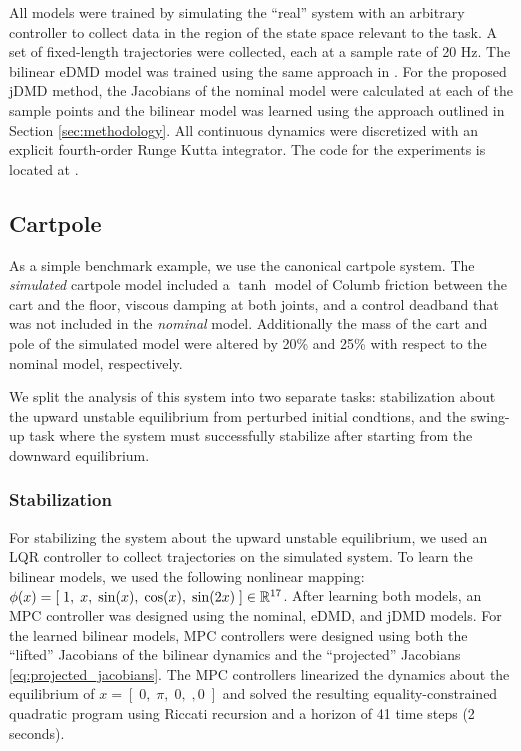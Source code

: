 \documentclass{article}
\begin{document}
All models were trained by simulating the ``real'' system with an arbitrary controller to 
collect data in the region of the state space relevant to the task. A set of fixed-length 
trajectories were collected, each at a sample rate of 20 Hz. The bilinear eDMD model was
trained using the same approach in \cite{Folkestad2021}. For the proposed jDMD method, the
Jacobians of the nominal model were calculated at each of the sample points and the bilinear
model was learned using the approach outlined in Section \ref{sec:methodology}.
All continuous dynamics were discretized with an explicit fourth-order Runge Kutta 
integrator. The code for the experiments is located at 
.


\subsection{Cartpole}
As a simple benchmark example, we use the canonical cartpole system. The \textit{simulated}
cartpole model included a $\tanh$ model of Columb friction between the cart and the 
floor, viscous damping at both joints, and a control deadband that was not included in the 
\textit{nominal} model. Additionally the mass of the cart and pole of the simulated model 
were altered by 20\% and 25\% with respect to the nominal model, respectively. 

We split the analysis of this system into two separate tasks: stabilization about the upward
unstable equilibrium from perturbed initial condtions, and the swing-up task where the 
system must successfully stabilize after starting from the downward equilibrium.

\subsubsection{Stabilization}

For stabilizing the system about the upward unstable equilibrium, we used an LQR controller
to collect trajectories on the simulated system. To learn
the bilinear models, we used the following nonlinear mapping: $\phi(x) = [\; 1,\; x,\;
\sin(x),\; \cos(x),\; \sin(2x)\; ] \in \mathbb{R}^{17}$.  After learning both models, an MPC
controller was designed using the nominal, eDMD, and jDMD models. For the learned bilinear
models, MPC controllers were designed using both the ``lifted'' Jacobians of the bilinear 
dynamics and the ``projected'' Jacobians \eqref{eq:projected_jacobians}. The MPC controllers
linearized the dynamics about the equilibrium of $x = [\;0,\; \pi,\; 0,\;, 0\;]$ and solved
the resulting equality-constrained quadratic program using Riccati recursion and a horizon
of 41 time steps (2 seconds). 
\end{document}
